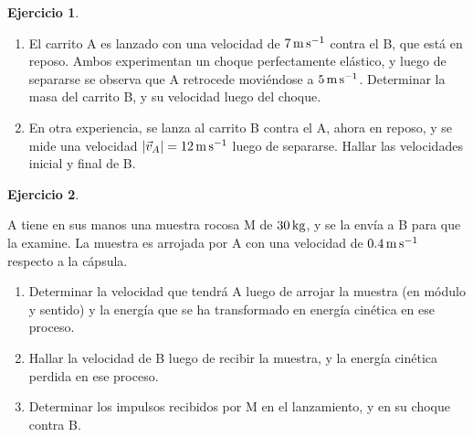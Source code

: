 \documentclass[a4paper,12pt,twoside]{book}
\newtheorem{ejercicio}{{Ejercicio}}[chapter]
\begin{document}
\begin{mdframed}[style=ejercicio-intermedio]
    \begin{ejercicio}
    \end{ejercicio}
    \begin{center}
        \def\svgwidth{0.5\linewidth}
        
    \end{center}
    \begin{enumerate}
        \item El carrito A es lanzado con una velocidad de $7 \, \si{\metre\per\second}$ contra el B, que está en reposo. Ambos experimentan un choque perfectamente elástico, y luego de separarse se observa que A retrocede moviéndose a $5 \, \si{\metre\per\second}$.
        Determinar la masa del carrito B, y su velocidad luego del choque.
        \item En otra experiencia, se lanza al carrito B contra el A, ahora en reposo, y se mide una velocidad ${\left| {\vec{v}_A} \right|}=12\,\si{\metre\per\second}$ luego de separarse.
        Hallar las velocidades inicial y final de B.
    \end{enumerate}
\end{mdframed}

\begin{mdframed}[style=ejercicio-intermedio]
    \begin{ejercicio}
    \end{ejercicio}
    A tiene en sus manos una muestra rocosa M de $30 \, \si{\kilo\gram}$, y se la envía a B para que la examine.
    La muestra es arrojada por A con una velocidad de $0.4 \, \si{\metre\per\second}$ respecto a la cápsula.
    \begin{center}
        \def\svgwidth{0.5\linewidth}
        
    \end{center}
    \begin{enumerate}
        \item Determinar la velocidad que tendrá A luego de arrojar la muestra (en módulo y sentido) y la energía que se ha transformado en energía cinética en ese proceso.
        \item Hallar la velocidad de B luego de recibir la muestra, y la energía cinética perdida en ese proceso.
        \item Determinar los impulsos recibidos por M en el lanzamiento, y en su choque contra B.
    \end{enumerate}
\end{mdframed}
\end{document}
